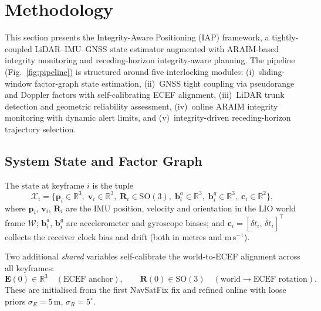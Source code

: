 \documentclass[journal]{IEEEtran}
\newcommand{\R}{\mathbb{R}}
\newcommand{\SO}{\mathrm{SO}(3)}
\newcommand{\E}{\mathbf{E}}           %
\newcommand{\Rext}{\mathbf{R}}        %
\newcommand{\pe}{\mathbf{p}}
\newcommand{\ve}{\mathbf{v}}
\begin{document}
\section{Methodology}
\label{sec:methodology}

This section presents the Integrity-Aware Positioning (IAP) framework, a
tightly-coupled LiDAR--IMU--GNSS state estimator augmented with
ARAIM-based integrity monitoring and receding-horizon integrity-aware
planning.  The pipeline (Fig.~\ref{fig:pipeline}) is structured around five
interlocking modules: (i)~sliding-window factor-graph state estimation,
(ii)~GNSS tight coupling via pseudorange and Doppler factors with
self-calibrating ECEF alignment, (iii)~LiDAR trunk detection and
geometric reliability assessment, (iv)~online ARAIM integrity monitoring
with dynamic alert limits, and (v)~integrity-driven receding-horizon
trajectory selection.

\subsection{System State and Factor Graph}
\label{sec:state}

The state at keyframe $i$ is the tuple
\begin{equation}
  \mathcal{X}_i = \bigl\{
    \pe_i \in \R^3,\;
    \ve_i \in \R^3,\;
    \mathbf{R}_i \in \SO,\;
    \mathbf{b}_i^a \in \R^3,\;
    \mathbf{b}_i^g \in \R^3,\;
    \mathbf{c}_i \in \R^2
  \bigr\},
  \label{eq:state}
\end{equation}
where $\pe_i$, $\ve_i$, $\mathbf{R}_i$ are the IMU position, velocity and
orientation in the LIO world frame $\mathcal{W}$; $\mathbf{b}_i^a$,
$\mathbf{b}_i^g$ are accelerometer and gyroscope biases; and
$\mathbf{c}_i = [\delta t_i,\,\dot{\delta t}_i]^\top$ collects the receiver
clock bias and drift (both in metres and m\,s$^{-1}$).

Two additional \emph{shared} variables self-calibrate the
world-to-ECEF alignment across all keyframes:
\begin{equation}
  \E(0) \in \R^3 \quad (\text{ECEF anchor}), \qquad
  \Rext(0) \in \SO \quad (\text{world}\to\text{ECEF rotation}).
  \label{eq:shared_vars}
\end{equation}
These are initialised from the first NavSatFix fix and refined online
with loose priors $\sigma_E = 5$\,m, $\sigma_R = 5^\circ$.
\end{document}
